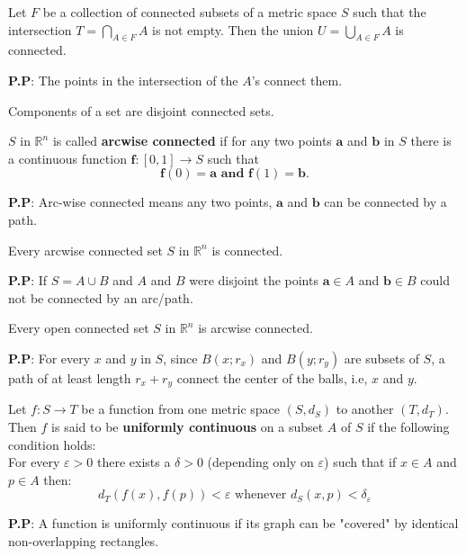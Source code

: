 \documentclass[10pt,a4paper]{book}
\begin{document}
\begin{Thm}
Let $F$ be a collection of connected subsets of a metric space $S$ such that the intersection $T = \bigcap_{A\in F} A$ is not empty. Then the union $U = \bigcup_{A \in F} A$ is connected.

\end{Thm}
\noindent \textbf{P.P}: The points in the intersection of the $A$'s connect them.

Components of a set are disjoint connected sets.

\begin{deff}
$S$ in $\mathbb{R}^n$ is called \textbf{arcwise connected} if for any two points $\mathbf{a}$ and $\mathbf{b}$ in $S$ there is a continuous function $\mathbf{f} : [0, 1] \rightarrow S$ such that
$$\mathbf{f}(0) = \mathbf{a} \textbf{    and    } \mathbf{f}(1) = \mathbf{b}. $$
\end{deff}
\noindent \textbf{P.P}: Arc-wise connected means any two points, $\mathbf{a}$ and $\mathbf{b}$ can be connected by a path. 

\begin{Thm}
Every arcwise connected set $S$ in $\mathbb{R}^n$ is connected.
\end{Thm}
\noindent \textbf{P.P}: If $S = A \cup B$ and $A$ and $B$ were disjoint the points $\mathbf{a} \in A$ and $\mathbf{b} \in B$ could not be connected by an arc/path.

\begin{Thm}
Every open connected set $S$ in $\mathbb{R}^n$ is arcwise connected.
\end{Thm}
\noindent \textbf{P.P}: For every $x$ and $y$ in $S$, since $B(x;r_x)$ and $B(y;r_y)$ are subsets of $S$, a path of at least length $r_x + r_y$ connect the center of the balls, i.e, $x$ and $y$.

\begin{Thm}
Let $f : S \rightarrow T$ be a function from one metric space $(S, d_S)$ to another $(T, d_T)$. Then $f$ is said to be \textbf{uniformly continuous} on a subset $A$ of $S$ if the following condition holds:\\
\hspace*{1cm} For every $\varepsilon > 0$ there exists a $\delta > 0$ (depending only on $\varepsilon$) such that if $x \in A$ and $p \in A$ then:
$$d_T(f(x), f(p)) < \varepsilon \text{   whenever  } d_S(x,p) < \delta_\varepsilon$$

\end{Thm}
\noindent \textbf{P.P}: A function is uniformly continuous if its graph can be "covered" by identical non-overlapping rectangles.
\end{document}
